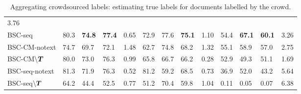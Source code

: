 \begin{table}
\begin{tabular}{l l l l r@{\hskip 0.8cm} l l l r@{\hskip 0.8cm} l l l r }
3.76 
\\ 
BSC-seq & 
80.3 & \textbf{74.8} & \textbf{77.4} & 0.65 & 
72.9 & 77.6 & \textbf{75.1} & 1.10 & 
54.4 & \textbf{67.1} & \textbf{60.1} & %
 3.26
\\ \midrule
BSC-CM-notext & 
74.7 & 69.7 & 72.1 & 1.48 & 
62.7 & 74.8 & 68.2 & 1.32 & 
55.1 & 58.9 & 57.0 & 2.75
\\
BSC-CM$\backslash\boldsymbol T$ & 
80.0 & 73.0 & 76.3 & 0.99 &
65.8 & 66.7 & 66.2 & 0.28 &
52.9 & 49.3 & 51.1 & 1.69
 \\
BSC-seq-notext & 
81.3 & 71.9 & 76.3 & 0.52 & 
81.2 & 59.2 & 68.5 & 0.73 &
36.9 & 52.0 & 43.2 & 5.64 
\\ 
BSC-seq$\backslash\boldsymbol T$ & 
64.2 & 44.4 & 52.5 & 0.77 &
51.2 & 70.4 & 59.8 & 1.04 &
0.11 & 0.05 & 0.07 & 6.38
\\
\bottomrule 
\end{tabular}
\caption{Aggregating crowdsourced labels: estimating true labels for documents labelled by the crowd.}
\label{tab:aggregation_results}
\npnoround
\end{table}

